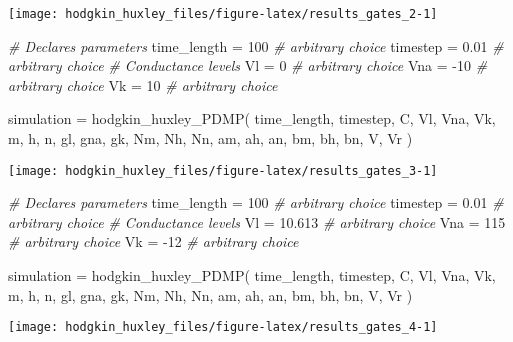 \documentclass[
]{article}
\newenvironment{Shaded}{\begin{snugshade}}{\end{snugshade}}
\newcommand{\CommentTok}[1]{\textcolor[rgb]{0.56,0.35,0.01}{\textit{#1}}}
\newcommand{\DecValTok}[1]{\textcolor[rgb]{0.00,0.00,0.81}{#1}}
\newcommand{\FloatTok}[1]{\textcolor[rgb]{0.00,0.00,0.81}{#1}}
\newcommand{\FunctionTok}[1]{\textcolor[rgb]{0.00,0.00,0.00}{#1}}
\newcommand{\NormalTok}[1]{#1}
\newcommand{\OtherTok}[1]{\textcolor[rgb]{0.56,0.35,0.01}{#1}}
\newcommand{\SpecialCharTok}[1]{\textcolor[rgb]{0.00,0.00,0.00}{#1}}
\begin{document}
\texttt{[image: hodgkin\_huxley\_files/figure-latex/results\_gates\_2-1]}

\begin{Shaded}
\begin{Highlighting}[]
\CommentTok{\# Declares parameters}
\NormalTok{time\_length }\OtherTok{=} \DecValTok{100}     \CommentTok{\# arbitrary choice}
\NormalTok{timestep    }\OtherTok{=} \FloatTok{0.01}    \CommentTok{\# arbitrary choice}
\CommentTok{\# Conductance levels}
\NormalTok{Vl          }\OtherTok{=} \DecValTok{0}       \CommentTok{\# arbitrary choice}
\NormalTok{Vna         }\OtherTok{=} \SpecialCharTok{{-}}\DecValTok{10}     \CommentTok{\# arbitrary choice}
\NormalTok{Vk          }\OtherTok{=} \DecValTok{10}      \CommentTok{\# arbitrary choice}

\NormalTok{simulation }\OtherTok{=} \FunctionTok{hodgkin\_huxley\_PDMP}\NormalTok{(}
\NormalTok{  time\_length, timestep,}
\NormalTok{  C, }
\NormalTok{  Vl, Vna, Vk, }
\NormalTok{  m, h, n,}
\NormalTok{  gl, gna, gk,}
\NormalTok{  Nm, Nh, Nn,}
\NormalTok{  am, ah, an, bm, bh, bn,}
\NormalTok{  V, Vr}
\NormalTok{)}
\end{Highlighting}
\end{Shaded}

\texttt{[image: hodgkin\_huxley\_files/figure-latex/results\_gates\_3-1]}

\begin{Shaded}
\begin{Highlighting}[]
\CommentTok{\# Declares parameters}
\NormalTok{time\_length }\OtherTok{=} \DecValTok{100}     \CommentTok{\# arbitrary choice}
\NormalTok{timestep    }\OtherTok{=} \FloatTok{0.01}    \CommentTok{\# arbitrary choice}
\CommentTok{\# Conductance levels}
\NormalTok{Vl          }\OtherTok{=} \FloatTok{10.613}  \CommentTok{\# arbitrary choice}
\NormalTok{Vna         }\OtherTok{=} \DecValTok{115}     \CommentTok{\# arbitrary choice}
\NormalTok{Vk          }\OtherTok{=} \SpecialCharTok{{-}}\DecValTok{12}     \CommentTok{\# arbitrary choice}

\NormalTok{simulation }\OtherTok{=} \FunctionTok{hodgkin\_huxley\_PDMP}\NormalTok{(}
\NormalTok{  time\_length, timestep,}
\NormalTok{  C, }
\NormalTok{  Vl, Vna, Vk, }
\NormalTok{  m, h, n,}
\NormalTok{  gl, gna, gk,}
\NormalTok{  Nm, Nh, Nn,}
\NormalTok{  am, ah, an, bm, bh, bn,}
\NormalTok{  V, Vr}
\NormalTok{)}
\end{Highlighting}
\end{Shaded}

\texttt{[image: hodgkin\_huxley\_files/figure-latex/results\_gates\_4-1]}
\end{document}
